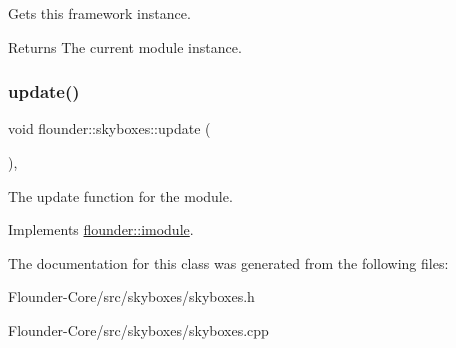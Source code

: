 Gets this framework instance. 

\begin{DoxyReturn}{Returns}
The current module instance. 
\end{DoxyReturn}
\mbox{\label{classflounder_1_1skyboxes_ae94e675bcda78f2af0298a8551b82aa6}} 
\subsubsection{\texorpdfstring{update()}{update()}}
{\footnotesize\ttfamily void flounder\+::skyboxes\+::update (\begin{DoxyParamCaption}{ }\end{DoxyParamCaption})\hspace{0.3cm}{\ttfamily [override]}, {\ttfamily [virtual]}}



The update function for the module. 



Implements \hyperlink{classflounder_1_1imodule_a9a53d48a46b5f6b16a92b2cd8503f74a}{flounder\+::imodule}.



The documentation for this class was generated from the following files\+:\begin{DoxyCompactItemize}
\item 
Flounder-\/\+Core/src/skyboxes/skyboxes.\+h\item 
Flounder-\/\+Core/src/skyboxes/skyboxes.\+cpp\end{DoxyCompactItemize}
